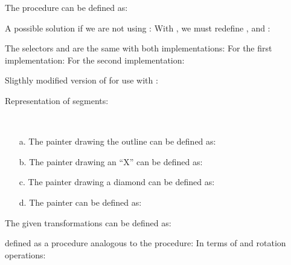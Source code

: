 \begin{exe}[2.45]
    The  procedure can be defined as:
\end{exe}

\begin{exe}[2.46]
    A possible solution if we are not using :
    With , we must redefine ,  
    and :
\end{exe}

\begin{exe}[2.47]
    The selectors  and  are the same with 
    both implementations:
    For the first implementation:
    For the second implementation:
\end{exe}

\begin{comp}
    Sligthly modified version of  for use with 
    :
\end{comp}

\begin{exe}[2.48]
    Representation of segments:
\end{exe}

\begin{exe}[2.49]
    \ \vspace{-20pt}
    \begin{itemize}
        \item[a.] The painter drawing the outline can be defined as: 
        \item[b.] The painter drawing an “X” can be defined as: 
        \item[c.] The painter drawing a diamond can be defined as: 
        \item[d.] The  painter can be defined as: 
    \end{itemize}
\end{exe}

\begin{exe}[2.50]
    The given transformations can be defined as:
\end{exe}

\begin{exe}[2.51]
     defined as a procedure analogous to the  
    procedure:
    In terms of  and rotation operations:
\end{exe}

